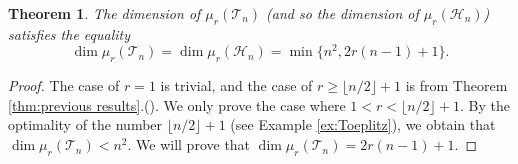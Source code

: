 \documentclass[reqno]{amsart}
\newtheorem{theorem}{Theorem}[section]
\theoremstyle{definition}
\numberwithin{equation}{section}
\begin{document}
\begin{theorem}\label{thm:dimension for Toeplitz and Hankel structures}
    The dimension of $\mu_r(\mathcal{T}_n)$ (and so the dimension of $\mu_r(\mathcal{H}_n)$) satisfies the equality
    \begin{equation*}
        \dim \mu_r(\mathcal{T}_n) = \dim \mu_r(\mathcal{H}_n) = \min\{n^2, 2r(n-1)+1\}.
    \end{equation*}
\end{theorem}
\begin{proof}
    The case of $r=1$ is trivial, and the case of $r \geq \lfloor n/2 \rfloor +1$ is from Theorem \ref{thm:previous results}.(). We only prove the case where $1<r<\lfloor n/2 \rfloor+1$. By the optimality of the number $\lfloor n/2 \rfloor+1$ (see Example \ref{ex:Toeplitz}), we obtain that $\dim \mu_r(\mathcal{T}_n) < n^2$. We will prove that $\dim \mu_r(\mathcal{T}_n)=2r(n-1)+1$. 
    

\end{proof}
\end{document}
